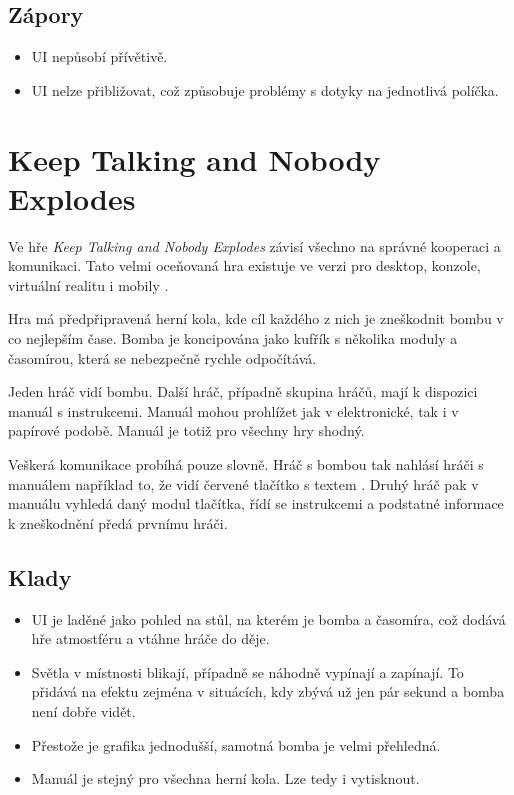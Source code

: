 \subsection*{Zápory}

\begin{itemize}
    \item UI nepůsobí přívětivě.
    \item UI nelze přibližovat,
což způsobuje problémy s dotyky na jednotlivá políčka.
\end{itemize}

\section{Keep Talking and Nobody Explodes}

Ve hře \emph{Keep Talking and Nobody Explodes} závisí všechno na správné
kooperaci a komunikaci.
Tato velmi oceňovaná hra existuje ve verzi pro desktop, konzole,
virtuální realitu i mobily \cite{steelcrategamesinc_keep}.

Hra má předpřipravená herní kola,
kde cíl každého z nich je zneškodnit bombu v co nejlepším čase.
Bomba je koncipována jako kufřík s několika moduly a časomírou,
která se nebezpečně rychle odpočítává.

Jeden hráč vidí bombu.
Další hráč, případně skupina hráčů, mají k dispozici manuál s instrukcemi.
Manuál mohou prohlížet jak v elektronické, tak i v papírové podobě.
Manuál je totiž pro všechny hry shodný.

Veškerá komunikace probíhá pouze slovně.
Hráč s bombou tak nahlásí hráči s manuálem například to,
že vidí červené tlačítko s textem .
Druhý hráč pak v manuálu vyhledá daný modul tlačítka, řídí se instrukcemi a
podstatné informace k zneškodnění předá prvnímu hráči.

\FloatBarrier

\subsection*{Klady}

\begin{itemize}
    \item UI je laděné jako pohled na stůl, na kterém je bomba a časomíra,
což dodává hře atmostféru a vtáhne hráče do děje.
    \item Světla v místnosti blikají, případně se náhodně vypínají a zapínají.
To přidává na efektu zejména v situácích,
kdy zbývá už jen pár sekund a bomba není dobře vidět.
    \item Přestože je grafika jednodušší, samotná bomba je velmi přehledná.
    \item Manuál je stejný pro všechna herní kola. Lze tedy i vytisknout.
\end{itemize}

